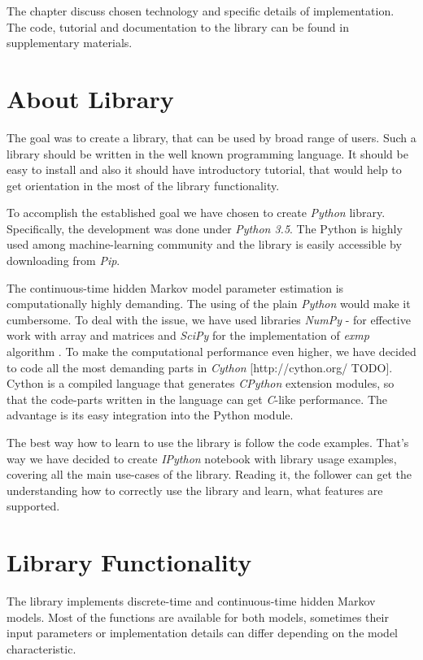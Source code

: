 \documentclass[thesis=M,english]{FITthesis}[2012/10/20]
\begin{document}
The chapter discuss chosen technology and specific details of implementation. 
The code, tutorial and documentation to the library can be found in supplementary materials.

\section{About Library}

The goal was to create a library, that can be used by broad range of users. Such a library should be written in the well known programming language. It should be easy to install and also it should have introductory tutorial, that would help to get orientation in the most of the library functionality. 

To accomplish the established goal we have chosen to create \textit{Python} library. Specifically, the development was done under \textit{Python 3.5}. The Python is highly used among machine-learning community and the library is easily accessible by downloading from \textit{Pip}. %

The continuous-time hidden Markov model parameter estimation is computationally highly demanding. The using of the plain \textit{Python} would make it cumbersome. To deal with the issue, we have used libraries \textit{NumPy} - for effective work with array and matrices and \textit{SciPy} \cite{Sc01} for the implementation of \textit{exmp} algorithm \cite{Hi05}. To make the computational performance even higher, we have decided to code all the most demanding parts in \textit{Cython} [http://cython.org/ TODO]. Cython is a compiled language that generates \textit{CPython} extension modules, so that the code-parts written in the language can get \textit{C}-like performance. The advantage is its easy integration into the Python module.

The best way how to learn to use the library is follow the code examples. That's way we have decided to create \textit{IPython} notebook with library usage examples, covering all the main use-cases of the library. Reading it, the follower can get the understanding how to correctly use the library and learn, what features are supported.          

\section{Library Functionality}

The library implements discrete-time and continuous-time hidden Markov models. Most of the functions are available for both models, sometimes their input parameters or implementation details can differ depending on the model characteristic. 
\end{document}
